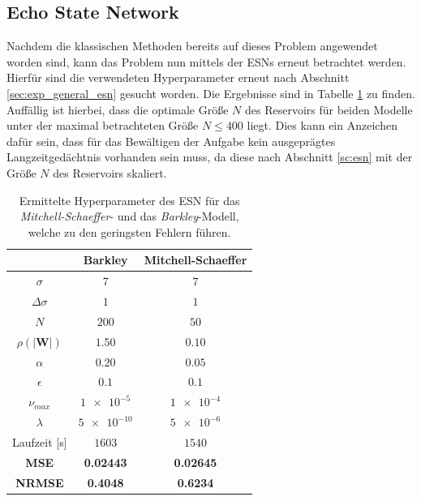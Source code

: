 \FloatBarrier
\subsection{Echo State Network}
Nachdem die klassischen Methoden bereits auf dieses Problem angewendet worden sind, kann das Problem nun mittels der \textsc{ESN}s erneut betrachtet werden. Hierfür sind die verwendeten Hyperparameter erneut nach Abschnitt \ref{sec:exp_general_esn} gesucht worden. Die Ergebnisse sind in Tabelle \ref{tab:exp_unblur_esn_results} zu finden. Auffällig ist hierbei, dass die optimale Größe $N$ des Reservoirs für beiden Modelle unter der maximal betrachteten Größe $N \leq 400$ liegt. Dies kann ein Anzeichen dafür sein, dass für das Bewältigen der Aufgabe kein ausgeprägtes Langzeitgedächtnis vorhanden sein muss, da diese nach Abschnitt \ref{sc:esn} mit der Größe $N$ des Reservoirs skaliert. 

\begin{table}[h]
	\centering
	\captionsetup{width=0.9\linewidth}
	\begin{tabular}{ccc}
		\hline		
		\multicolumn{1}{c}{} &  Barkley & Mitchell-Schaeffer \\ 
		\hline
		\rule[-1ex]{0pt}{2.5ex} $\sigma$ & $7$ & $7$ \\ 
		\rule[-1ex]{0pt}{2.5ex} $\Delta \sigma$ & $1$ & $1$ \\ 
		\rule[-1ex]{0pt}{3.5ex} $N$ & $200$ & $50$ \\ 
		\rule[-1ex]{0pt}{3.5ex} $\rho(|\mathbf{W}|)$ & $1.50$ & $0.10$\\ 
		\rule[-1ex]{0pt}{3.5ex} $\alpha$ & $0.20$ & $0.05$ \\ 
		\rule[-1ex]{0pt}{3.5ex} $\epsilon$ & $0.1$ & $0.1$ \\ 
		\rule[-1ex]{0pt}{3.5ex} $\nu_{max}$ & $\num{1e-5}$ & $\num{1e-4}$\\ 
		\rule[-1ex]{0pt}{3.5ex} $\lambda$ & $\num{5e-10}$ & $\num{5e-6}$\\ 
		\rule[-1ex]{0pt}{2.5ex} Laufzeit [s] & $1603$ & $1540$ \\ 
		\rule[-1ex]{0pt}{2.5ex} \textbf{MSE} & \textbf{0.02443} & \textbf{0.02645} \\ 
		\rule[-1ex]{0pt}{2.5ex} \textbf{NRMSE} & \textbf{0.4048} & \textbf{0.6234} \\ 
		\hline 
	\end{tabular} 
	\caption{Ermittelte Hyperparameter des \textsc{ESN} für das \textit{Mitchell-Schaeffer}- und das \textit{Barkley}-Modell, welche zu den geringsten Fehlern führen.}
	\label{tab:exp_unblur_esn_results}
\end{table}

